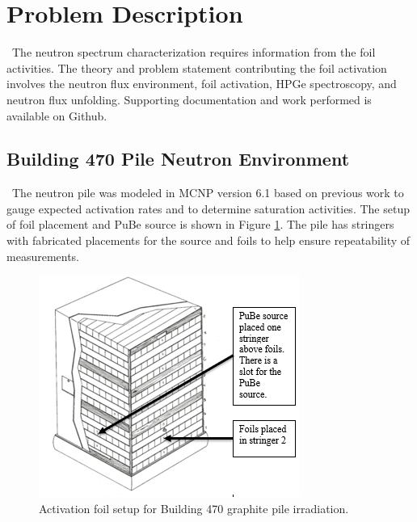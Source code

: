 \documentclass[journal]{IEEEtran}
\let\MYoriglatexcaption\caption
\renewcommand{\caption}[2][\relax]{\MYoriglatexcaption[#2]{#2}}
\begin{document}

	\section{Problem Description}
	
    \ The neutron spectrum characterization requires information from the foil activities. 
The theory and problem statement contributing the foil activation involves the neutron flux environment, foil activation, HPGe spectroscopy, and neutron flux unfolding. 
Supporting documentation and work performed is available on Github\cite{Me}. 
	
	\subsection{Building 470 Pile Neutron Environment }
	\ The neutron pile was modeled in MCNP version 6.1 %
based on previous work to gauge expected activation rates and to determine saturation activities\cite{Will}. 
The setup of foil placement and PuBe source is shown in Figure \ref{fig:pile}. 
The pile has stringers with fabricated placements for the source and foils to help ensure repeatability of measurements. 
	
	\begin{figure}[h!]
		\includegraphics[width=\linewidth]{Figures/PileSetup.png}
		\caption{Activation foil setup for Building 470 graphite pile irradiation.}
		\label{fig:pile}
	\end{figure}
\end{document}
